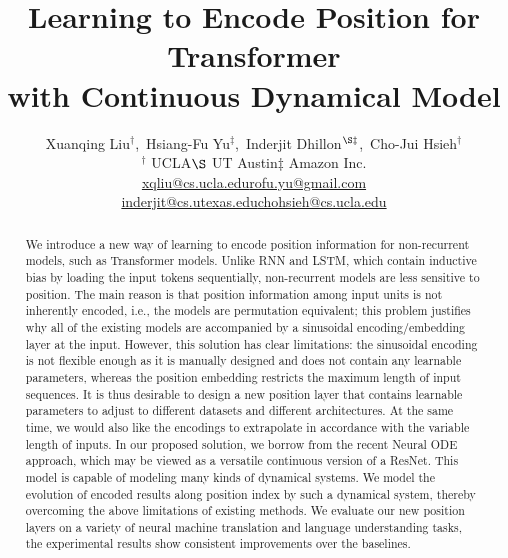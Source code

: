 \documentclass[11pt]{article}
\title{Learning to Encode Position for Transformer \\ with Continuous Dynamical Model}
\author{
\small Xuanqing Liu$^\dag$,\ Hsiang-Fu Yu$^\ddag$,\ Inderjit Dhillon$^{\S\ddag}$,\ Cho-Jui Hsieh$^\dag$\\
\small $^\dag$ UCLA\quad $\S$ UT Austin\quad $\ddag$ Amazon Inc.\\
\small \href{mailto:xqliu@cs.ucla.edu}{xqliu@cs.ucla.edu}\quad \href{mailto:rofu.yu@gmail.com}{rofu.yu@gmail.com}\\ 
\small \href{mailto:inderjit@cs.utexas.edu}{inderjit@cs.utexas.edu}\quad \href{mailto:chohsieh@cs.ucla.edu}{chohsieh@cs.ucla.edu} \\
}
\date{}
\begin{document}
\maketitle
\begin{abstract}
 We introduce a new way of learning to encode position information for non-recurrent models, such as Transformer models. Unlike RNN and LSTM, which contain inductive bias by loading the input tokens sequentially, non-recurrent models are less sensitive to position. The main reason is that position information among input units is not inherently encoded, i.e., the models are permutation equivalent; this problem justifies why all of the existing models are accompanied by a sinusoidal encoding/embedding layer at the input. However, this solution has clear limitations: the sinusoidal encoding is not flexible enough as it is manually designed and does not contain any learnable parameters, whereas the position embedding restricts the maximum length of input sequences. It is thus desirable to design a new position layer that contains learnable parameters to adjust to different datasets and different architectures. At the same time, we would also like the encodings to extrapolate in accordance with the variable length of inputs. In our proposed solution, we borrow from the recent Neural ODE approach, which may be viewed as a versatile continuous version of a ResNet. This model is capable of modeling many kinds of dynamical systems. We model the evolution of encoded results along position index by such a dynamical system, thereby overcoming the above limitations of existing methods. We evaluate our new position layers on a variety of neural machine translation and language understanding tasks, the experimental results show consistent improvements over the baselines.
\end{abstract}
\end{document}

